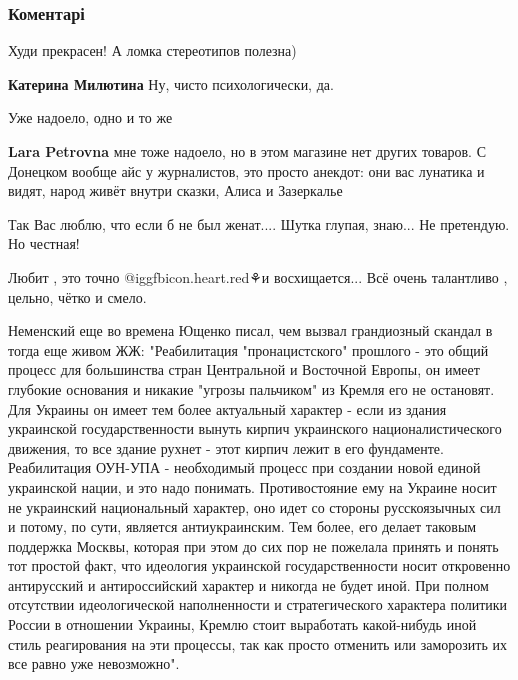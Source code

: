  
 
 
 
 
\subsubsection{Коментарі}
\label{sec:11_10_2021.fb.bilchenko_evgenia.1.opyt.cmt}

\begin{itemize} %
Худи прекрасен! А ломка стереотипов полезна)

\begin{itemize} %
\textbf{Катерина Милютина} Ну, чисто психологически, да.
\end{itemize} %

Уже надоело, одно и то же

\begin{itemize} %
\textbf{Lara Petrovna} мне тоже надоело, но в этом магазине нет других товаров. С Донецком вообще айс у журналистов, это просто анекдот: они вас лунатика и видят, народ живёт внутри сказки, Алиса и Зазеркалье
\end{itemize} %

Так Вас люблю, что если б не был женат....
Шутка глупая, знаю... Не претендую. Но честная!

Любит , это точно
@igg{fbicon.heart.red}⚘и восхищается...
Всё очень талантливо , цельно, чётко и смело.


Неменский еще во времена Ющенко писал, чем вызвал грандиозный скандал в тогда
еще живом ЖЖ: "Реабилитация "пронацистского" прошлого - это общий процесс для
большинства стран Центральной и Восточной Европы, он имеет глубокие основания и
никакие "угрозы пальчиком" из Кремля его не остановят. Для Украины он имеет тем
более актуальный характер - если из здания украинской государственности вынуть
кирпич украинского националистического движения, то все здание рухнет - этот
кирпич лежит в его фундаменте. Реабилитация ОУН-УПА - необходимый процесс при
создании новой единой украинской нации, и это надо понимать. Противостояние ему
на Украине носит не украинский национальный характер, оно идет со стороны
русскоязычных сил и потому, по сути, является антиукраинским. Тем более, его
делает таковым поддержка Москвы, которая при этом до сих пор не пожелала
принять и понять тот простой факт, что идеология украинской государственности
носит откровенно антирусский и антироссийский характер и никогда не будет иной.
При полном отсутствии идеологической наполненности и стратегического характера
политики России в отношении Украины, Кремлю стоит выработать какой-нибудь иной
стиль реагирования на эти процессы, так как просто отменить или заморозить их
все равно уже невозможно".


\end{itemize}

